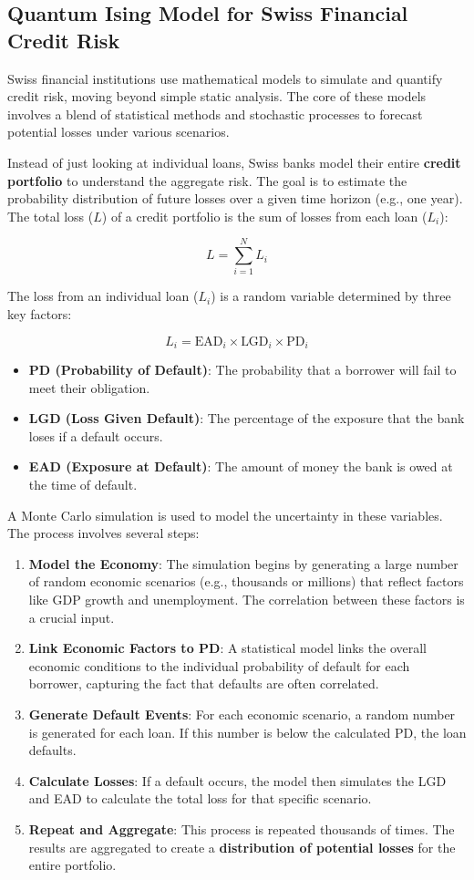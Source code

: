 \documentclass{article}
\begin{document}
\subsection{Quantum Ising Model for Swiss Financial Credit Risk}
Swiss financial institutions use mathematical models to simulate and quantify credit risk, moving beyond simple static analysis. The core of these models involves a blend of statistical methods and stochastic processes to forecast potential losses under various scenarios.


Instead of just looking at individual loans, Swiss banks model their entire \textbf{credit portfolio} to understand the aggregate risk. The goal is to estimate the probability distribution of future losses over a given time horizon (e.g., one year). The total loss ($L$) of a credit portfolio is the sum of losses from each loan ($L_i$):

$$ L = \sum_{i=1}^{N} L_i $$

The loss from an individual loan ($L_i$) is a random variable determined by three key factors:

$$ L_i = \text{EAD}_i \times \text{LGD}_i \times \text{PD}_i $$

\begin{itemize}
    \item \textbf{PD (Probability of Default)}: The probability that a borrower will fail to meet their obligation.
    \item \textbf{LGD (Loss Given Default)}: The percentage of the exposure that the bank loses if a default occurs.
    \item \textbf{EAD (Exposure at Default)}: The amount of money the bank is owed at the time of default.
\end{itemize}

A Monte Carlo simulation is used to model the uncertainty in these variables. The process involves several steps:

\begin{enumerate}
    \item \textbf{Model the Economy}: The simulation begins by generating a large number of random economic scenarios (e.g., thousands or millions) that reflect factors like GDP growth and unemployment. The correlation between these factors is a crucial input.
    \item \textbf{Link Economic Factors to PD}: A statistical model links the overall economic conditions to the individual probability of default for each borrower, capturing the fact that defaults are often correlated.
    \item \textbf{Generate Default Events}: For each economic scenario, a random number is generated for each loan. If this number is below the calculated PD, the loan defaults.
    \item \textbf{Calculate Losses}: If a default occurs, the model then simulates the LGD and EAD to calculate the total loss for that specific scenario.
    \item \textbf{Repeat and Aggregate}: This process is repeated thousands of times. The results are aggregated to create a \textbf{distribution of potential losses} for the entire portfolio.
\end{enumerate}
\end{document}

